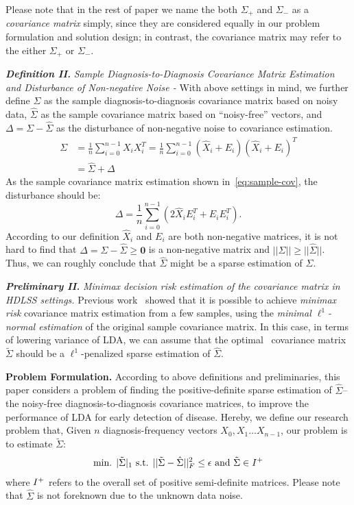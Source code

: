 \documentclass[journal,compsoc]{IEEEtran}
\begin{document}
Please note that in the rest of paper we name the both $\Sigma_{+}$ and $\Sigma_{-}$  as a \emph{covariance matrix} simply, since they are considered equally in our problem formulation and solution design; in contrast, the covariance matrix may refer to the either $\Sigma_{+}$ or $\Sigma_{-}$.

\textbf{\em Definition II.} \emph{Sample Diagnosis-to-Diagnosis Covariance Matrix Estimation and Disturbance of Non-negative Noise - } With above settings in mind, we further define $\Sigma$ as the sample diagnosis-to-diagnosis covariance matrix based on noisy data, $\hat{\Sigma}$ as the sample covariance matrix based on ``noisy-free'' vectors, and  $\Delta=\Sigma-\hat{\Sigma}$ as the disturbance of non-negative noise to covariance estimation.
%
\begin{equation}
\begin{aligned}
\Sigma&=\frac{1}{n}\sum_{i=0}^{n-1} X_iX_i^T
=\frac{1}{n}\sum_{i=0}^{n-1} (\hat{X}_i+E_i)(\hat{X}_i+E_i)^T\\
&=\hat{\Sigma}+\Delta
\end{aligned}
\label{eq:sample-cov}
\end{equation}
As the sample covariance matrix estimation shown in~\ref{eq:sample-cov}, the disturbance should be:
%
$$\Delta=\frac{1}{n}\sum_{i=0}^{n-1}(2\hat{X}_iE_i^T+E_iE_i^T).$$ 
%
According to our definition $\hat{X}_i$ and $E_i$ are both non-negative matrices, it is not hard to find that $\Delta=\Sigma-\hat{\Sigma}\geq \textbf{0}$ is a non-negative matrix and $||\Sigma||\geq ||\hat{\Sigma}||$. Thus, we can roughly conclude that $\hat{\Sigma}$ might be a sparse estimation of $\Sigma$. 

\textbf{\em Preliminary II. } \emph{Minimax decision risk estimation of the covariance matrix in HDLSS settings.} Previous work~\cite{cai2012minimax,xue2012positive} showed that it is possible to achieve \emph{minimax risk} covariance matrix estimation from a few samples, using the \emph{minimal $\ell^1$-normal estimation} of the original sample covariance matrix. In this case, in terms of lowering variance of LDA, we can assume that the optimal~\cite{cai2012minimax} covariance matrix $\tilde{\Sigma}$ should be a $\ell^1$-penalized sparse estimation of $\hat{\Sigma}$.

\textbf{Problem Formulation. } According to above definitions and preliminaries, this paper considers a problem of finding the positive-definite sparse estimation of $\hat{\Sigma}$--the noisy-free diagnosis-to-diagnosis covariance matrices, to improve the performance of LDA for early detection of disease. Hereby, we define our research problem that, Given $n$ diagnosis-frequency vectors $X_0,X_1\dots X_{n-1}$,  our problem is to estimate $\tilde{\Sigma}$:
\begin{equation}
\begin{aligned}
\text{min. }|\tilde{\Sigma}|_1 \text{ s.t. }||\tilde{\Sigma}-\hat{\Sigma}||_F^2\leq \epsilon\text{ and }\tilde{\Sigma}\in {\bf }I^+
\end{aligned}
\label{eq:problem}
\end{equation}
where ${\bf }I^+$ refers to the overall set of positive semi-definite matrices. Please note that $\hat{\Sigma}$ is not foreknown due to the unknown data noise. 
\end{document}
